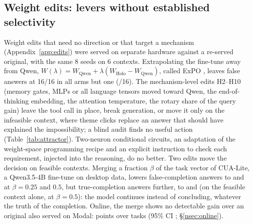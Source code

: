 \subsection{Weight edits: levers without established selectivity}
\label{nsec:attractor}
Weight edits that need no direction or that target a mechanism (Appendix~\ref{app:edits}) were served on separate hardware against a re-served original, with the same 8 seeds on 6 contexts. Extrapolating the fine-tune away from Qwen, $W(\lambda)=W_{\text{Qwen}}+\lambda(W_{\text{Holo}}-W_{\text{Qwen}})$, called ExPO \citep{zheng2024expo}, leaves false answers at 16/16 in all arms but one (\expoFspMin/16). The mechanism-level edits H2--H10 (memory gates, MLPs or all language tensors moved toward Qwen, the end-of-thinking embedding, the attention temperature, the rotary share of the query gain) leave the tool call in place, break generation, or move it only on the infeasible context, where theme clicks replace an answer that should have explained the impossibility; a blind audit finds no useful action (Table~\ref{tab:attractor}). Two-neuron conditional circuits, an adaptation of the weight-space programming recipe and an explicit instruction to check each requirement, injected into the reasoning, do no better. Two edits move the decision on feasible contexts. Merging a fraction $\beta$ of the task vector of CUA-Lite, a Qwen3.5-4B fine-tune on desktop data, lowers false-completion answers to \mergeCuaQFsp{} and \mergeCuaFsp{} at $\beta=0.25$ and $0.5$, but true-completion answers further, to \mergeCuaQFsm{} and \mergeCuaFsm{} (on the feasible \fsp{} context alone, \infMergeCuaHalfExcl{} at $\beta=0.5$): the model continues instead of concluding, whatever the truth of the completion. Online, the merge shows no detectable gain over an original also served on Modal: \onAllCuaDelta{} points over \onAllCuaN{} tasks (95\% CI \onAllCuaCi; \S\ref{nsec:online}).

